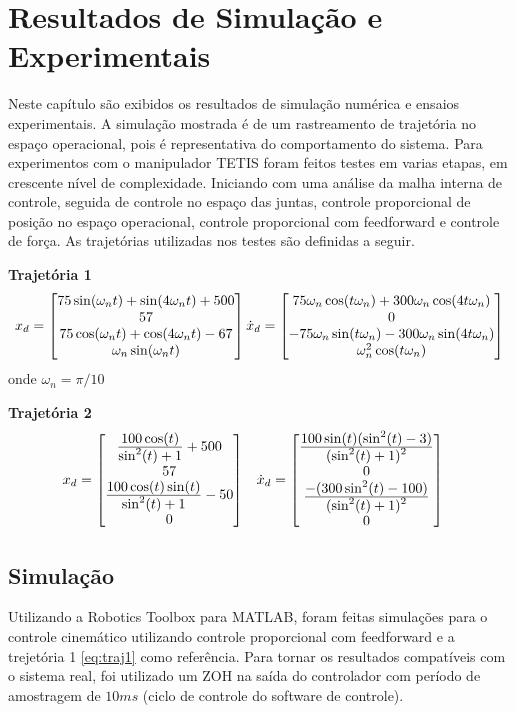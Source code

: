\chapter{Resultados de Simulação e Experimentais}

Neste capítulo são exibidos os resultados de simulação numérica e ensaios experimentais. A simulação mostrada é de um rastreamento de trajetória no espaço operacional, pois é representativa do comportamento do sistema. Para experimentos com o manipulador TETIS foram feitos testes em varias etapas, em crescente nível de complexidade. Iniciando com uma análise da malha interna de controle, seguida de controle no espaço das juntas, controle proporcional de posição no espaço operacional, controle proporcional com feedforward e controle de força. As trajetórias utilizadas nos testes são definidas a seguir.

\textbf{Trajetória 1}
\begin{gather} \label{eq:traj1}
{x_d} = \begin{bmatrix}75 \sin(\omega_n t) + \sin (4 \omega_n t) + 500 \\ 57 \\ 75 \cos(\omega_n t) + \cos(4\omega_n t) -67 \\ \omega_n \sin(\omega_nt) \end{bmatrix}
{\dot{x}_d} = \begin{bmatrix}75\omega_n \cos(t\omega_n) + 300 \omega_n \cos(4t\omega_n) \\
0 \\
-75 \omega_n \sin(t \omega_n) - 300 \omega_n \sin(4t\omega_n) \\
\omega_n^2 \cos(t \omega_n)\end{bmatrix}
\end{gather}
onde $\omega_n = \pi/10$

\textbf{Trajetória 2} 
\begin{align} \label{eq:traj2}
{x_d} &= \begin{bmatrix} 
\frac{\displaystyle 100 \cos(t)}{\displaystyle \sin^2(t) + 1} + 500 \\
57 \\
\frac{\displaystyle 100\cos(t) \sin(t)}{\displaystyle \sin^2(t) + 1} -50 \\
0
\end{bmatrix} &&
{\dot{x}_d} = \begin{bmatrix}
\frac{\displaystyle 100\sin(t) (\sin^2(t) -3 )}{\displaystyle (\sin^2(t) + 1)^2} \\
0 \\
\frac{\displaystyle -(300 \sin^2(t) - 100)}{\displaystyle (\sin^2(t) + 1)^2} \\
0\end{bmatrix}
\end{align}

\section{Simulação}
Utilizando a Robotics Toolbox \citep{petercorke} para MATLAB\circledR, foram feitas simulações para o controle cinemático utilizando controle proporcional com feedforward e a trejetória 1 \eqref{eq:traj1} como referência. Para tornar os resultados compatíveis com o sistema real, foi utilizado um ZOH na saída do controlador com período de amostragem de $10ms$ (ciclo de controle do software de controle).

